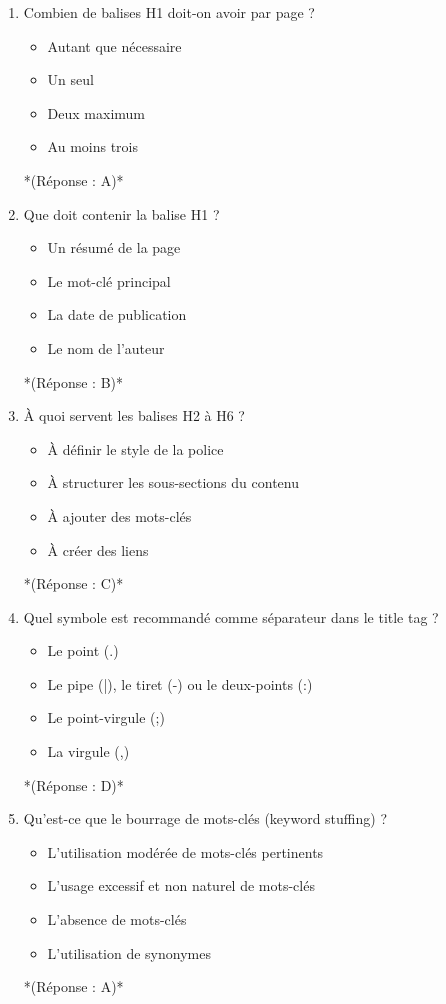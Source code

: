 \documentclass[12pt,a4paper,twoside]{report}
\begin{document}
\begin{enumerate}
\item Combien de balises H1 doit-on avoir par page ?
\begin{itemize}
\item[A)] Autant que nécessaire
\item[B)] Un seul
\item[C)] Deux maximum
\item[D)] Au moins trois
\end{itemize}
*(Réponse : A)*

\item Que doit contenir la balise H1 ?
\begin{itemize}
\item[A)] Un résumé de la page
\item[B)] Le mot-clé principal
\item[C)] La date de publication
\item[D)] Le nom de l'auteur
\end{itemize}
*(Réponse : B)*

\item À quoi servent les balises H2 à H6 ?
\begin{itemize}
\item[A)] À définir le style de la police
\item[B)] À structurer les sous-sections du contenu
\item[C)] À ajouter des mots-clés
\item[D)] À créer des liens
\end{itemize}
*(Réponse : C)*

\item Quel symbole est recommandé comme séparateur dans le title tag ?
\begin{itemize}
\item[A)] Le point (.)
\item[B)] Le pipe (|), le tiret (-) ou le deux-points (:)
\item[C)] Le point-virgule (;)
\item[D)] La virgule (,)
\end{itemize}
*(Réponse : D)*

\item Qu'est-ce que le bourrage de mots-clés (keyword stuffing) ?
\begin{itemize}
\item[A)] L'utilisation modérée de mots-clés pertinents
\item[B)] L'usage excessif et non naturel de mots-clés
\item[C)] L'absence de mots-clés
\item[D)] L'utilisation de synonymes
\end{itemize}
*(Réponse : A)*


\end{enumerate}
\end{document}
